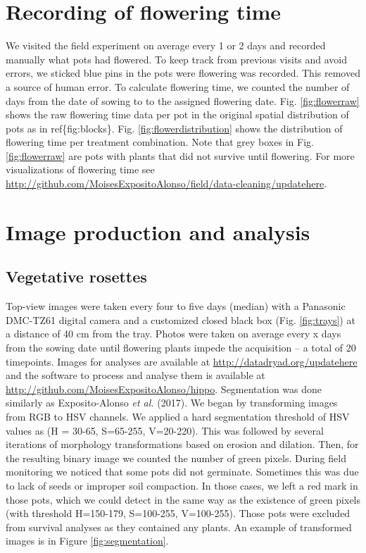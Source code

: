 \documentclass[12pt,]{article}
\begin{document}
\section{Recording of flowering time}\label{recording-of-flowering-time}

We visited the field experiment on average every 1 or 2 days and
recorded manually what pots had flowered. To keep track from previous
visits and avoid errors, we sticked blue pins in the pots were flowering
was recorded. This removed a source of human error. To calculate
flowering time, we counted the number of days from the date of sowing to
to the assigned flowering date. Fig. \ref{fig:flowerraw} shows the raw
flowering time data per pot in the original spatial distribution of pots
as in ref\{fig:blocks\}. Fig. \ref{fig:flowerdistribution} shows the
distribution of flowering time per treatment combination. Note that grey
boxes in Fig. \ref{fig:flowerraw} are pots with plants that did not
survive until flowering. For more visualizations of flowering time see
\url{http://github.com/MoisesExpositoAlonso/field/data-cleaning/updatehere}.

\section{Image production and
analysis}\label{image-production-and-analysis}

\subsection{Vegetative rosettes}\label{vegetative-rosettes}

Top-view images were taken every four to five days (median) with a
Panasonic DMC-TZ61 digital camera and a customized closed black box
(Fig. \ref{fig:trays}) at a distance of 40 cm from the tray. Photos were
taken on average every x days from the sowing date until flowering
plants impede the acquisition -- a total of 20 timepoints. Images for
analyses are available at \url{http://datadryad.org/updatehere} and the
software to process and analyse them is available at
\url{http://github.com/MoisesExpositoAlonso/hippo}. Segmentation was
done similarly as Exposito-Alonso \emph{et al.} (2017). We began by
transforming images from RGB to HSV channels. We applied a hard
segmentation threshold of HSV values as (H = 30-65, S=65-255, V=20-220).
This was followed by several iterations of morphology transformations
based on erosion and dilation. Then, for the resulting binary image we
counted the number of green pixels. During field monitoring we noticed
that some pots did not germinate. Sometimes this was due to lack of
seeds or improper soil compaction. In those cases, we left a red mark in
those pots, which we could detect in the same way as the existence of
green pixels (with threshold H=150-179, S=100-255, V=100-255). Those
pots were excluded from survival analyses as they contained any plants.
An example of transformed images is in Figure \ref{fig:segmentation}.
\end{document}
